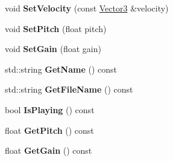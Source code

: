 \begin{DoxyCompactItemize}
void {\bfseries Set\+Velocity} (const \hyperlink{class_flounder_1_1_vector3}{Vector3} \&velocity)
\item 
\mbox{\label{class_flounder_1_1_sound_a264691b64fbc65eabb75e1c3112d0813}} 
void {\bfseries Set\+Pitch} (float pitch)
\item 
\mbox{\label{class_flounder_1_1_sound_a87dfdf48f4f2a3bb8507cd41dc7d21c5}} 
void {\bfseries Set\+Gain} (float gain)
\item 
\mbox{\label{class_flounder_1_1_sound_ada7591a35c1fcae9cb8254ad54ea427d}} 
std\+::string {\bfseries Get\+Name} () const
\item 
\mbox{\label{class_flounder_1_1_sound_ac874a91660ad17def70b0908e59d1cfb}} 
std\+::string {\bfseries Get\+File\+Name} () const
\item 
\mbox{\label{class_flounder_1_1_sound_afb3c410c5152624868b720164a9c2c04}} 
bool {\bfseries Is\+Playing} () const
\item 
\mbox{\label{class_flounder_1_1_sound_a0d0f34a818c54441dc435b7536daf608}} 
float {\bfseries Get\+Pitch} () const
\item 
\mbox{\label{class_flounder_1_1_sound_a01721a1a1b46f6123e70c7e1035184f1}} 
float {\bfseries Get\+Gain} () const
\end{DoxyCompactItemize}
